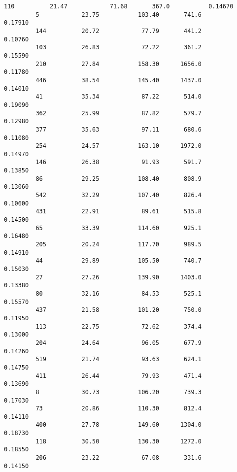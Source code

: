 \documentclass[11pt]{article}
\begin{document}
\begin{Verbatim}[commandchars=\\\{\}]
         110          21.47            71.68       367.0           0.14670   
         5            23.75           103.40       741.6           0.17910   
         144          20.72            77.79       441.2           0.10760   
         103          26.83            72.22       361.2           0.15590   
         210          27.84           158.30      1656.0           0.11780   
         446          38.54           145.40      1437.0           0.14010   
         41           35.34            87.22       514.0           0.19090   
         362          25.99            87.82       579.7           0.12980   
         377          35.63            97.11       680.6           0.11080   
         254          24.57           163.10      1972.0           0.14970   
         146          26.38            91.93       591.7           0.13850   
         86           29.25           108.40       808.9           0.13060   
         542          32.29           107.40       826.4           0.10600   
         431          22.91            89.61       515.8           0.14500   
         65           33.39           114.60       925.1           0.16480   
         205          20.24           117.70       989.5           0.14910   
         44           29.89           105.50       740.7           0.15030   
         27           27.26           139.90      1403.0           0.13380   
         80           32.16            84.53       525.1           0.15570   
         437          21.58           101.20       750.0           0.11950   
         113          22.75            72.62       374.4           0.13000   
         204          24.64            96.05       677.9           0.14260   
         519          21.74            93.63       624.1           0.14750   
         411          26.44            79.93       471.4           0.13690   
         8            30.73           106.20       739.3           0.17030   
         73           20.86           110.30       812.4           0.14110   
         400          27.78           149.60      1304.0           0.18730   
         118          30.50           130.30      1272.0           0.18550   
         206          23.22            67.08       331.6           0.14150   
         

\end{Verbatim}
\end{document}
